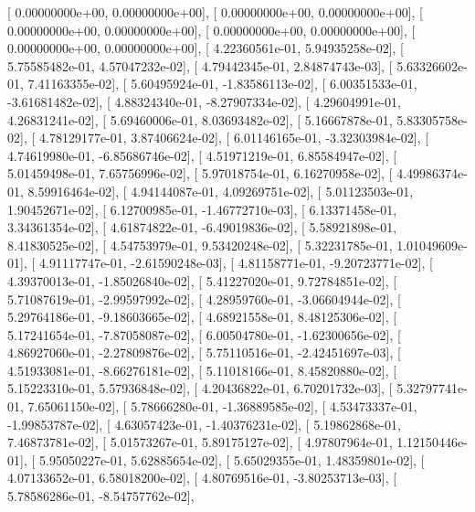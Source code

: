 \documentclass{article}
\begin{document}
       [  0.00000000e+00,   0.00000000e+00],
       [  0.00000000e+00,   0.00000000e+00],
       [  0.00000000e+00,   0.00000000e+00],
       [  0.00000000e+00,   0.00000000e+00],
       [  0.00000000e+00,   0.00000000e+00],
       [  4.22360561e-01,   5.94935258e-02],
       [  5.75585482e-01,   4.57047232e-02],
       [  4.79442345e-01,   2.84874743e-03],
       [  5.63326602e-01,   7.41163355e-02],
       [  5.60495924e-01,  -1.83586113e-02],
       [  6.00351533e-01,  -3.61681482e-02],
       [  4.88324340e-01,  -8.27907334e-02],
       [  4.29604991e-01,   4.26831241e-02],
       [  5.69460006e-01,   8.03693482e-02],
       [  5.16667878e-01,   5.83305758e-02],
       [  4.78129177e-01,   3.87406624e-02],
       [  6.01146165e-01,  -3.32303984e-02],
       [  4.74619980e-01,  -6.85686746e-02],
       [  4.51971219e-01,   6.85584947e-02],
       [  5.01459498e-01,   7.65756996e-02],
       [  5.97018754e-01,   6.16270958e-02],
       [  4.49986374e-01,   8.59916464e-02],
       [  4.94144087e-01,   4.09269751e-02],
       [  5.01123503e-01,   1.90452671e-02],
       [  6.12700985e-01,  -1.46772710e-03],
       [  6.13371458e-01,   3.34361354e-02],
       [  4.61874822e-01,  -6.49019836e-02],
       [  5.58921898e-01,   8.41830525e-02],
       [  4.54753979e-01,   9.53420248e-02],
       [  5.32231785e-01,   1.01049609e-01],
       [  4.91117747e-01,  -2.61590248e-03],
       [  4.81158771e-01,  -9.20723771e-02],
       [  4.39370013e-01,  -1.85026840e-02],
       [  5.41227020e-01,   9.72784851e-02],
       [  5.71087619e-01,  -2.99597992e-02],
       [  4.28959760e-01,  -3.06604944e-02],
       [  5.29764186e-01,  -9.18603665e-02],
       [  4.68921558e-01,   8.48125306e-02],
       [  5.17241654e-01,  -7.87058087e-02],
       [  6.00504780e-01,  -1.62300656e-02],
       [  4.86927060e-01,  -2.27809876e-02],
       [  5.75110516e-01,  -2.42451697e-03],
       [  4.51933081e-01,  -8.66276181e-02],
       [  5.11018166e-01,   8.45820880e-02],
       [  5.15223310e-01,   5.57936848e-02],
       [  4.20436822e-01,   6.70201732e-03],
       [  5.32797741e-01,   7.65061150e-02],
       [  5.78666280e-01,  -1.36889585e-02],
       [  4.53473337e-01,  -1.99853787e-02],
       [  4.63057423e-01,  -1.40376231e-02],
       [  5.19862868e-01,   7.46873781e-02],
       [  5.01573267e-01,   5.89175127e-02],
       [  4.97807964e-01,   1.12150446e-01],
       [  5.95050227e-01,   5.62885654e-02],
       [  5.65029355e-01,   1.48359801e-02],
       [  4.07133652e-01,   6.58018200e-02],
       [  4.80769516e-01,  -3.80253713e-03],
       [  5.78586286e-01,  -8.54757762e-02],
\end{document}
